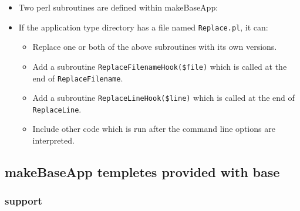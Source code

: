 \begin{itemize}
\item Two perl subroutines are defined within makeBaseApp:


\item If the application type directory has a file named \verb|Replace.pl|, it can:

\begin{itemize}
\item Replace one or both of the above subroutines with its own versions.

\item Add a subroutine \verb|ReplaceFilenameHook($file)| which is called at the end of \verb|ReplaceFilename|.

\item Add a subroutine \verb|ReplaceLineHook($line)| which is called at the end of \verb|ReplaceLine|.

\item Include other code which is run after the command line options are interpreted.
\end{itemize}
\end{itemize}


\subsection{makeBaseApp templetes provided with base}

\subsubsection{support}

